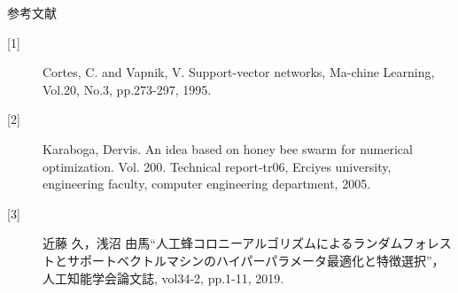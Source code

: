 \documentclass[12pt, cjk, dvipdfmx]{beamer}
\begin{document}
\begin{frame}
\begin{columns}[t]
\begin{column}{0.490\linewidth}
            \begin{mybox}{参考文献}
              \scriptsize
              \begin{description}
                \item[{[1]}] Cortes, C. and Vapnik, V. Support-vector networks, Ma-chine Learning, Vol.20, No.3, pp.273-297, 1995.
                \item[{[2]}] Karaboga, Dervis. An idea based on honey bee swarm for numerical optimization. Vol. 200. Technical report-tr06, Erciyes university, engineering faculty, computer engineering department, 2005.
                \item[{[3]}] 近藤 久，浅沼 由馬“人工蜂コロニーアルゴリズムによるランダムフォレストとサポートベクトルマシンのハイパーパラメータ最適化と特徴選択”，人工知能学会論文誌, vol34-2, pp.1-11, 2019.
              \end{description}
            \end{mybox}
        \end{column}
      \end{columns}
  \end{frame}
\end{document}
